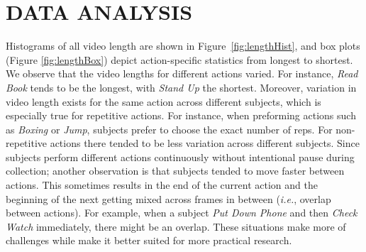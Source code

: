 \documentclass[a4paper, 10pt, conference]{ieeeconf}      \usepackage{FG2020}
\newcommand*\ie{\textit{i.e.}}
\begin{document}
\begin{table}[!tp]
\begin{center}
\caption{A list of the 20 actions included in EV-Action.}\label{table:actions}
\vspace{-2mm}
\end{center}
\vspace{-7mm}
\end{table}


\section{DATA ANALYSIS}
Histograms of all video length are shown in Figure~\ref{fig:lengthHist}, and box plots (Figure \ref{fig:lengthBox}) depict action-specific statistics from longest to shortest. We observe that the video lengths for different actions varied. For instance, \textit{Read Book} tends to be the longest, with \textit{Stand Up} the shortest. Moreover, variation in video length exists for the same action across different subjects, which is especially true for repetitive actions. For instance, when preforming actions such as \textit{Boxing} or \textit{Jump}, subjects prefer to choose the exact number of reps. For non-repetitive actions there tended to be less variation across different subjects. Since subjects perform different actions continuously without intentional pause during collection; another observation is that subjects tended to move faster between actions. This sometimes results in the end of the current action and the beginning of the next getting mixed across frames in between (\ie, overlap between actions). For example, when a subject \textit{Put Down Phone} and then \textit{Check Watch} immediately, there might be an overlap. These situations make more of challenges while make it better suited for more practical research.
\end{document}
